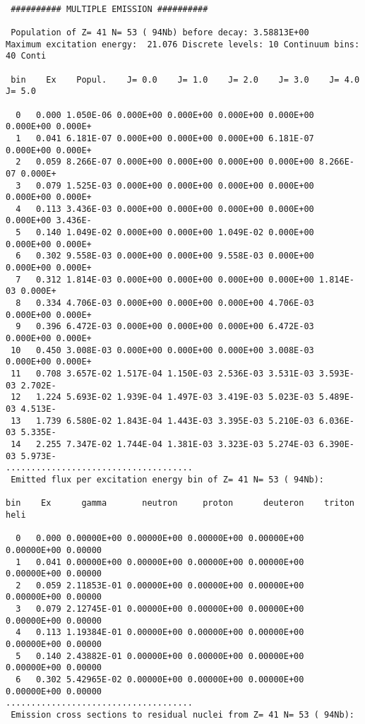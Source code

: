\begin{samplecase}
{\small \begin{verbatim}

 ########## MULTIPLE EMISSION ##########

 Population of Z= 41 N= 53 ( 94Nb) before decay: 3.58813E+00
Maximum excitation energy:  21.076 Discrete levels: 10 Continuum bins: 40 Conti

 bin    Ex    Popul.    J= 0.0    J= 1.0    J= 2.0    J= 3.0    J= 4.0    J= 5.0

  0   0.000 1.050E-06 0.000E+00 0.000E+00 0.000E+00 0.000E+00 0.000E+00 0.000E+
  1   0.041 6.181E-07 0.000E+00 0.000E+00 0.000E+00 6.181E-07 0.000E+00 0.000E+
  2   0.059 8.266E-07 0.000E+00 0.000E+00 0.000E+00 0.000E+00 8.266E-07 0.000E+
  3   0.079 1.525E-03 0.000E+00 0.000E+00 0.000E+00 0.000E+00 0.000E+00 0.000E+
  4   0.113 3.436E-03 0.000E+00 0.000E+00 0.000E+00 0.000E+00 0.000E+00 3.436E-
  5   0.140 1.049E-02 0.000E+00 0.000E+00 1.049E-02 0.000E+00 0.000E+00 0.000E+
  6   0.302 9.558E-03 0.000E+00 0.000E+00 9.558E-03 0.000E+00 0.000E+00 0.000E+
  7   0.312 1.814E-03 0.000E+00 0.000E+00 0.000E+00 0.000E+00 1.814E-03 0.000E+
  8   0.334 4.706E-03 0.000E+00 0.000E+00 0.000E+00 4.706E-03 0.000E+00 0.000E+
  9   0.396 6.472E-03 0.000E+00 0.000E+00 0.000E+00 6.472E-03 0.000E+00 0.000E+
 10   0.450 3.008E-03 0.000E+00 0.000E+00 0.000E+00 3.008E-03 0.000E+00 0.000E+
 11   0.708 3.657E-02 1.517E-04 1.150E-03 2.536E-03 3.531E-03 3.593E-03 2.702E-
 12   1.224 5.693E-02 1.939E-04 1.497E-03 3.419E-03 5.023E-03 5.489E-03 4.513E-
 13   1.739 6.580E-02 1.843E-04 1.443E-03 3.395E-03 5.210E-03 6.036E-03 5.335E-
 14   2.255 7.347E-02 1.744E-04 1.381E-03 3.323E-03 5.274E-03 6.390E-03 5.973E-
.....................................
 Emitted flux per excitation energy bin of Z= 41 N= 53 ( 94Nb):
   
bin    Ex      gamma       neutron     proton      deuteron    triton      heli

  0   0.000 0.00000E+00 0.00000E+00 0.00000E+00 0.00000E+00 0.00000E+00 0.00000
  1   0.041 0.00000E+00 0.00000E+00 0.00000E+00 0.00000E+00 0.00000E+00 0.00000
  2   0.059 2.11853E-01 0.00000E+00 0.00000E+00 0.00000E+00 0.00000E+00 0.00000
  3   0.079 2.12745E-01 0.00000E+00 0.00000E+00 0.00000E+00 0.00000E+00 0.00000
  4   0.113 1.19384E-01 0.00000E+00 0.00000E+00 0.00000E+00 0.00000E+00 0.00000
  5   0.140 2.43882E-01 0.00000E+00 0.00000E+00 0.00000E+00 0.00000E+00 0.00000
  6   0.302 5.42965E-02 0.00000E+00 0.00000E+00 0.00000E+00 0.00000E+00 0.00000
.....................................
 Emission cross sections to residual nuclei from Z= 41 N= 53 ( 94Nb):
   

\end{verbatim}}
\end{samplecase}
